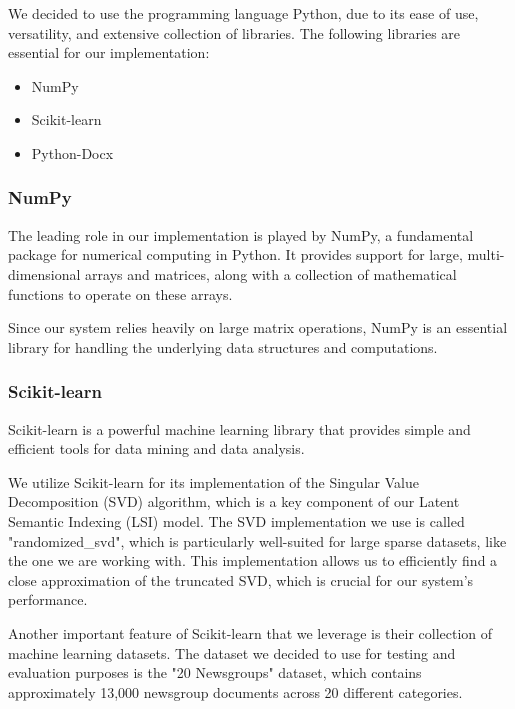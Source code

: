 \documentclass[12pt,a4paper]{article}
\begin{document}
    \noindent We decided to use the programming language Python, due to its ease of use, versatility, and extensive collection of libraries. The following libraries are essential for our implementation:

    \begin{itemize}
        \item NumPy
        \item Scikit-learn
        \item Python-Docx
    \end{itemize}
        \bigskip
        \noindent
    
        \subsubsection{NumPy}

        \noindent The leading role in our implementation is played by NumPy, a fundamental package for numerical computing in Python. It provides support for large, multi-dimensional arrays and matrices, along with a collection of mathematical functions to operate on these arrays.

        \bigskip  
        \noindent Since our system relies heavily on large matrix operations, NumPy is an essential library for handling the underlying data structures and computations.

        \bigskip
        \subsubsection{Scikit-learn}

        \noindent Scikit-learn is a powerful machine learning library that provides simple and efficient tools for data mining and data analysis.
        
        \bigskip
        \noindent We utilize Scikit-learn for its implementation of the Singular Value Decomposition (SVD) algorithm, which is a key component of our Latent Semantic Indexing (LSI) model. The SVD implementation we use is called "randomized\_svd", which is particularly well-suited for large sparse datasets, like the one we are working with. This implementation allows us to efficiently find a close approximation of the truncated SVD, which is crucial for our system's performance.

        \bigskip
        \noindent Another important feature of Scikit-learn that we leverage is their collection of machine learning datasets. The dataset we decided to use for testing and evaluation purposes is the "20 Newsgroups" dataset, which contains approximately 13,000 newsgroup documents across 20 different categories.
\end{document}

